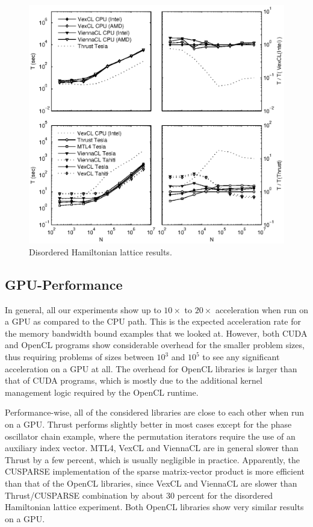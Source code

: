 \documentclass[final]{siamltex}
\begin{document}
\begin{figure}
    \begin{center}
        \includegraphics[width=\textwidth]{data/disordered_ham_lattice/perfmtx}
    \end{center}
    \caption{Disordered Hamiltonian lattice results.}
    \label{fig:lattice:perf}
\end{figure}

\subsection{GPU-Performance}
In general, all our experiments show up to $10\times$ to $20\times$
acceleration when run on a GPU as compared to the CPU path. This is the
expected acceleration rate for the memory bandwidth bound examples that we
looked at. However, both CUDA and OpenCL programs show considerable overhead
for the smaller problem sizes, thus requiring problems of sizes between $10^3$
and $10^5$ to see any significant acceleration on a GPU at all. The overhead
for OpenCL libraries is larger than that of CUDA programs, which is mostly due
to the additional kernel management logic required by the OpenCL runtime.

Performance-wise, all of the considered libraries are close to each other when
run on a GPU.  Thrust performs slightly better in most cases except for the
phase oscillator chain example, where the permutation iterators require the use
of an auxiliary index vector.  MTL4, VexCL and ViennaCL are in general slower
than Thrust by a few percent, which is usually negligible in practice.
Apparently, the CUSPARSE implementation of the sparse matrix-vector product is
more efficient than that of the OpenCL libraries, since VexCL and ViennaCL are
slower than Thrust/CUSPARSE combination by about 30 percent for the disordered
Hamiltonian lattice experiment.  Both OpenCL libraries show very similar
results on a GPU.
\end{document}
